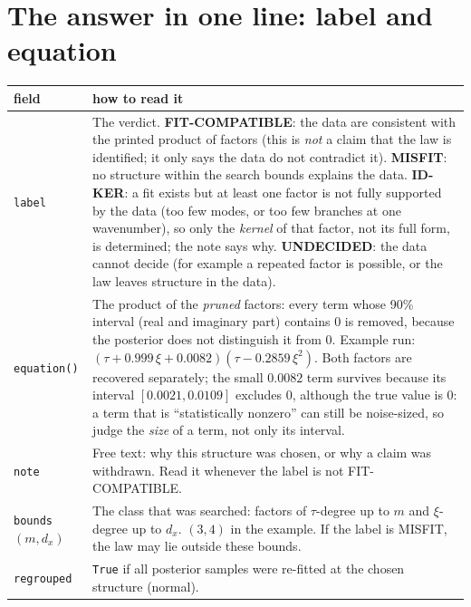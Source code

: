 \documentclass[11pt,a4paper]{article}
\newcommand{\code}[1]{\texttt{#1}}
\begin{document}
\section{The answer in one line: label and equation}
\begin{center}\small
\begin{tabular}{L{4.0cm}L{10.0cm}}\toprule
\textbf{field} & \textbf{how to read it}\\\midrule
\code{label} & The verdict. \textbf{FIT-COMPATIBLE}: the data are consistent with the printed product of factors (this is \emph{not} a claim that the law is identified; it only says the data do not contradict it). \textbf{MISFIT}: no structure within the search bounds explains the data. \textbf{ID-KER}: a fit exists but at least one factor is not fully supported by the data (too few modes, or too few branches at one wavenumber), so only the \emph{kernel} of that factor, not its full form, is determined; the note says why. \textbf{UNDECIDED}: the data cannot decide (for example a repeated factor is possible, or the law leaves structure in the data).\\
\code{equation()} & The product of the \emph{pruned} factors: every term whose 90\% interval (real and imaginary part) contains 0 is removed, because the posterior does not distinguish it from 0. Example run: $(\tau+0.999\,\xi+0.0082)(\tau-0.2859\,\xi^2)$. Both factors are recovered separately; the small $0.0082$ term survives because its interval $[0.0021,0.0109]$ excludes 0, although the true value is 0: a term that is ``statistically nonzero'' can still be noise-sized, so judge the \emph{size} of a term, not only its interval.\\
\code{note} & Free text: why this structure was chosen, or why a claim was withdrawn. Read it whenever the label is not FIT-COMPATIBLE.\\
\code{bounds} $(m,d_x)$ & The class that was searched: factors of $\tau$-degree up to $m$ and $\xi$-degree up to $d_x$. $(3,4)$ in the example. If the label is MISFIT, the law may lie outside these bounds.\\
\code{regrouped} & \code{True} if all posterior samples were re-fitted at the chosen structure (normal).\\\bottomrule
\end{tabular}
\end{center}
\end{document}
